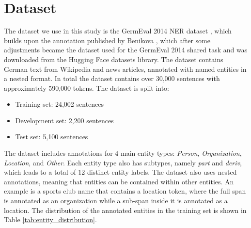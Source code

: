 \documentclass[11pt,a4paper,twocolumn]{article}
\begin{document}
\section{Dataset}
The dataset we use in this study is the GermEval 2014 NER dataset \cite{germeval14_hf}, which builds upon the annotation published by Benikova \cite{benikova_nosta-d_nodate}, which after some adjustments became the dataset used for the GermEval 2014 shared task \cite{benikova_germeval_nodate} and was downloaded from the Hugging Face datasets library. The dataset contains German text from Wikipedia and news articles, annotated with named entities in a nested format. In total the dataset contains over 30,000 sentences with approximately 590,000 tokens. The dataset is split into:
\begin{itemize}
    \item Training set: 24,002 sentences
    \item Development set: 2,200 sentences
    \item Test set: 5,100 sentences
\end{itemize}
The dataset includes annotations for 4 main entity types: \textit{Person}, \textit{Organization}, \textit{Location}, and \textit{Other}. Each entity type also has subtypes, namely \textit{part} and \textit{deriv}, which leads to a total of 12 distinct entity labels. The dataset also uses nested annotations, meaning that entities can be contained within other entities. An example is a sports club name that contains a location token, where the full span is annotated as an organization while a sub-span inside it is annotated as a location. The distribution of the annotated entities in the training set is shown in Table \ref{tab:entity_distribution}.
\end{document}
